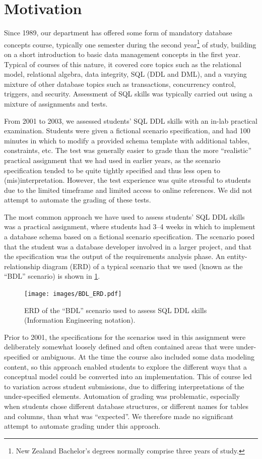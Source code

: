 \documentclass[sigconf, authordraft, capitalise]{acmart}
\begin{document}
\section{Motivation}
\label{sec-motivation}

Since 1989, our department has offered some form of mandatory database concepts course, typically one semester during the second year\footnote{New Zealand Bachelor's degrees normally comprise three years of study.} of study, building on a short introduction to basic data management concepts in the first year. Typical of courses of this nature, it covered core topics such as the relational model, relational algebra, data integrity, SQL (DDL and DML), and a varying mixture of other database topics such as transactions, concurrency control, triggers, and security. Assessment of SQL skills was typically carried out using a mixture of assignments and tests.

From 2001 to 2003, we assessed students' SQL DDL skills with an in-lab practical examination. Students were given a fictional scenario specification, and had 100 minutes in which to modify a provided schema template with additional tables, constraints, etc. The test was generally easier to grade than the more ``realistic'' practical assignment that we had used in earlier years, as the scenario specification tended to be quite tightly specified and thus less open to (mis)interpretation. However, the test experience was quite stressful to students due to the limited timeframe and limited access to online references. We did not attempt to automate the grading of these tests.

The most common approach we have used to assess students' SQL DDL skills was a practical assignment, where students had 3--4 weeks in which to implement a database schema based on a fictional scenario specification. The scenario posed that the student was a database developer involved in a larger project, and that the specification was the output of the requirements analysis phase. An entity-relationship diagram (ERD) of a typical scenario that we used (known as the ``BDL'' scenario) is shown in \cref{fig-ERD}.
 
 
\begin{figure}[hb]
    \centering
    \texttt{[image: images/BDL\_ERD.pdf]} 
    \caption{ERD of the ``BDL'' scenario used to assess SQL DDL skills (Information Engineering notation).}
    \label{fig-ERD}
\end{figure}


Prior to 2001, the specifications for the scenarios used in this assignment were deliberately somewhat loosely defined and often contained areas that were under-specified or ambiguous. At the time the course also included some data modeling content, so this approach enabled students to explore the different ways that a conceptual model could be converted into an implementation. This of course led to variation across student submissions, due to differing interpretations of the under-specified elements. Automation of grading was problematic, especially when students chose different database structures, or different names for tables and columns, than what was ``expected''. We therefore made no significant attempt to automate grading under this approach.
\end{document}
